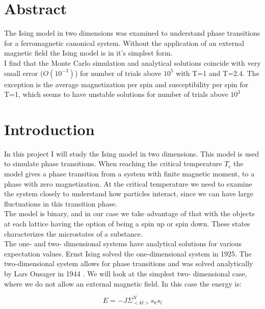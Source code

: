 

\section{Abstract}
The Ising model in two dimensions was examined to understand phase transitions for a ferromagnetic canonical system. Without the application of an external magnetic field the Ising model is in it's simplest form.\\


I find that the Monte Carlo simulation and analytical solutions coincide with very small error ($O(10^{-3})$) for number of trials above $10^5$ with T=1 and T=2.4. The exception is the average magnetization per spin and susceptibility per spin for T=1, which seems to have unstable solutions  for number of trials above $10^3$





\section{Introduction}
In this project I will study the Ising model in two dimensions. This model is used to simulate phase transitions. When reaching the critical temperature $T_c$ the model gives a phase transition from a system with finite magnetic moment, to a phase with zero magnetization. At the critical temperature we need to examine the system closely to understand how particles interact, since we can have large fluctuations in this transition phase.\\



The model is binary, and in our case we take advantage of that with the objects at each lattice having the option of being a spin up or spin down. These states characterizes the microstates of a substance. \cite{spin}\\




The one- and two- dimensional systems have analytical solutions for various expectation values. Ernst Ising solved the one-dimensional system in 1925. The two-dimensional system allows for phase transitions and was solved analytically by Lars Onsager in 1944 \cite{ising}.  We will look at the simplest two- dimensional case, where we do not allow an external magnetic field. In this case the energy is:


\begin{equation}
E = -J\Sigma_{<kl>}^Ns_ks_l
\end{equation}

